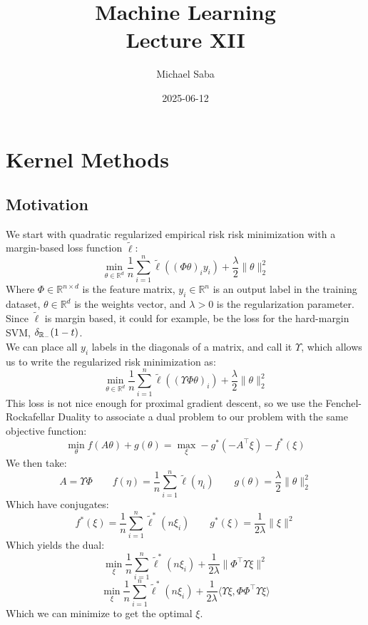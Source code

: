 \documentclass[12pt]{article}
\title{%
    \Huge Machine Learning \\
    \Large Lecture XII
}
\date{2025-06-12}
\author{Michael Saba}
\begin{document}
\maketitle
\newpage
\setlength{\parindent}{0pt}

\section*{Kernel Methods}
\subsection*{Motivation}


We start with quadratic regularized empirical risk
risk minimization with a margin-based loss 
function $\tilde{\ell}$:
\[ \min_{\theta \in \mathbb{R}^d} \frac{1}{n} 
\sum_{i=1}^n \tilde{\ell}((\Phi \theta)_i y_i) + 
\frac{\lambda}{2} \|\theta\|_2^2 \] 
Where $\Phi \in 
\mathbb{R}^{n \times d}$ is the feature matrix,
$y_i \in \mathbb{R}^n$ is an output label in the
training dataset, $\theta \in \mathbb{R}^d$
is the weights vector, and  $\lambda > 0$
is the regularization parameter. \\
Since $\tilde{\ell}$ is margin based, it could for 
example, be the loss for the hard-margin SVM,
$\delta_{\mathbb{R}_-}(1-t)$. \\

We can place all $y_i$ labels in the diagonals of
a matrix, and call it $\Upsilon$,
which allows us to write the regularized risk
minimization as:
\[ \min_{\theta \in \mathbb{R}^d} \frac{1}{n} 
\sum_{i=1}^n \tilde{\ell}((\Upsilon \Phi \theta)_i) + 
\frac{\lambda}{2} \|\theta\|_2^2\]
This loss is not nice enough for proximal gradient
descent, so we use the Fenchel-Rockafellar Duality
to associate a dual problem to our problem with the
same objective function:
\[ \min_{\theta} f(A\theta) + g(\theta) = 
\max_{\xi} -g^*(-A^\top \xi) - f^*(\xi) \]
We then take:
\[ A = \Upsilon \Phi \qquad 
f(\eta) = \frac{1}{n} \sum_{i=1}^n \tilde{\ell}(\eta_i) 
\qquad g(\theta) = \frac{\lambda}{2} \|\theta\|^2_2\]
Which have conjugates:
\[ f^*(\xi) = \frac{1}{n} \sum_{i=1}^n 
\tilde{\ell}^*(n\xi_i) \qquad 
g^*(\xi) = \frac{1}{2\lambda} \|\xi\|^2\]
Which yields the dual:
\[ \min_{\xi} \frac{1}{n} \sum_{i=1}^n 
\tilde{\ell}^*(n\xi_i) + \frac{1}{2\lambda} 
\|\Phi^\top \Upsilon \xi\|^2\] 
\[ \min_{\xi} \frac{1}{n} \sum_{i=1}^n 
\tilde{\ell}^*(n\xi_i) + \frac{1}{2\lambda} \langle 
\Upsilon \xi, \Phi \Phi^\top \Upsilon \xi \rangle \]
Which we can minimize to get the optimal $\xi$. \\
\end{document}
